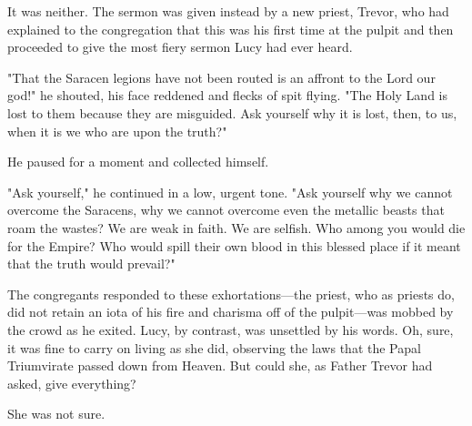 It was neither. The sermon was given instead by a new priest, Trevor, who had
explained to the congregation that this was his first time at the pulpit and
then proceeded to give the most fiery sermon Lucy had ever heard.

"That the Saracen legions have not been routed is an affront to the Lord our
god!" he shouted, his face reddened and flecks of spit flying. "The Holy Land
is lost to them because they are misguided. Ask yourself why it is lost, then,
to us, when it is we who are upon the truth?"

He paused for a moment and collected himself.

"Ask yourself," he continued in a low, urgent tone. "Ask yourself why we cannot
overcome the Saracens, why we cannot overcome even the metallic beasts that
roam the wastes? We are weak in faith. We are selfish. Who among you would die
for the Empire? Who would spill their own blood in this blessed place if it
meant that the truth would prevail?"

The congregants responded to these exhortations---the priest, who as priests
do, did not retain an iota of his fire and charisma off of the pulpit---was
mobbed by the crowd as he exited. Lucy, by contrast, was unsettled by his
words. Oh, sure, it was fine to carry on living as she did, observing the
laws that the Papal Triumvirate passed down from Heaven. But could she, as
Father Trevor had asked, give everything?

She was not sure.
